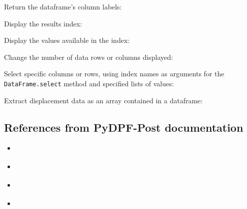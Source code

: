 \documentclass[9pt,landscape]{article}
\begin{document}
\begin{multicols}{3}

Return the dataframe's column labels:


Display the results index:


Display the values available in the index:


Change the number of data rows or columns displayed:


Select specific columns or rows, using index names as arguments for the \texttt{DataFrame.select} method and specified lists of values:


Extract displacement data as an array contained in a dataframe:



\subsection{References from PyDPF-Post documentation}
\begin{multicols}{2}
\begin{itemize}
    \item \href{https://post.docs.pyansys.com/version/stable/getting_started/index.html}{\color{blue}{Getting started}}
    \item \href{https://post.docs.pyansys.com/version/stable/user_guide/index.html}{\color{blue}{User guide}}
    \item \href{https://post.docs.pyansys.com/version/stable/examples/index.html}{\color{blue}{Examples}}
    \item \href{https://post.docs.pyansys.com/version/stable/api/index.html}{\color{blue}{API reference}}
\end{itemize}
\end{multicols}
\end{multicols}
\end{document}

